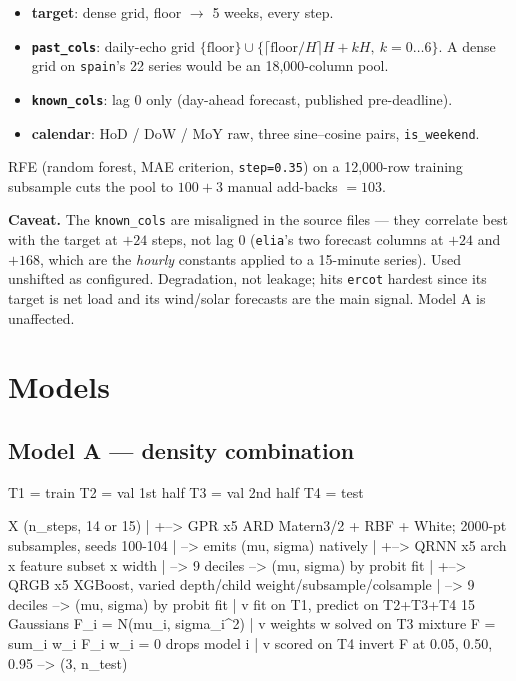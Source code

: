 \documentclass[11pt,a4paper]{article}
\begin{document}
\begin{itemize}[leftmargin=1.4em,itemsep=1pt]
  \item \textbf{target}: dense grid, floor $\rightarrow$ 5 weeks, every step.
  \item \textbf{\texttt{past\_cols}}: daily-echo grid
        $\{\mathrm{floor}\} \cup \{\lceil \mathrm{floor}/H \rceil H + kH,\ k = 0\ldots6\}$.
        A dense grid on \texttt{spain}'s 22 series would be an 18{,}000-column pool.
  \item \textbf{\texttt{known\_cols}}: lag 0 only (day-ahead forecast, published pre-deadline).
  \item \textbf{calendar}: HoD / DoW / MoY raw, three sine--cosine pairs, \texttt{is\_weekend}.
\end{itemize}

\noindent
RFE (random forest, MAE criterion, \texttt{step=0.35}) on a 12{,}000-row training subsample
cuts the pool to $100 + 3$ manual add-backs $= 103$.

\medskip
\noindent
\textbf{Caveat.} The \texttt{known\_cols} are misaligned in the source files --- they correlate
best with the target at $+24$ steps, not lag 0 (\texttt{elia}'s two forecast columns at $+24$
and $+168$, which are the \emph{hourly} constants applied to a 15-minute series). Used
unshifted as configured. Degradation, not leakage; hits \texttt{ercot} hardest since its target
is net load and its wind/solar forecasts are the main signal. Model A is unaffected.

\section{Models}

\subsection{Model A --- density combination}

\begin{codetiny}
                    T1 = train        T2 = val 1st half
                    T3 = val 2nd half T4 = test

   X (n_steps, 14 or 15)
        |
        +--> GPR  x5   ARD Matern3/2 + RBF + White; 2000-pt subsamples, seeds 100-104
        |              --> emits (mu, sigma) natively
        |
        +--> QRNN x5   arch x feature subset x width
        |              --> 9 deciles --> (mu, sigma) by probit fit
        |
        +--> QRGB x5   XGBoost, varied depth/child weight/subsample/colsample
        |              --> 9 deciles --> (mu, sigma) by probit fit
        |
        v        fit on T1, predict on T2+T3+T4
   15 Gaussians  F_i = N(mu_i, sigma_i^2)
        |
        v        weights w solved on T3
   mixture  F = sum_i w_i F_i          w_i = 0 drops model i
        |
        v        scored on T4
   invert F at {0.05, 0.50, 0.95}  -->  (3, n_test)
\end{codetiny}
\end{document}
